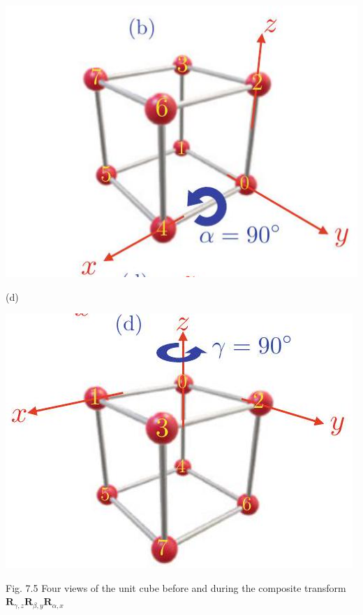 \documentclass[10pt]{article}
\begin{document}
\begin{center}
\includegraphics[max width=\textwidth]{2023_04_20_41f1ceac5a31dc7d1b59g-120(2)}
\end{center}

(d)

\begin{center}
\includegraphics[max width=\textwidth]{2023_04_20_41f1ceac5a31dc7d1b59g-120(5)}
\end{center}

Fig. 7.5 Four views of the unit cube before and during the composite transform $\mathbf{R}_{\gamma, z} \mathbf{R}_{\beta, y} \mathbf{R}_{\alpha, x}$
\end{document}
